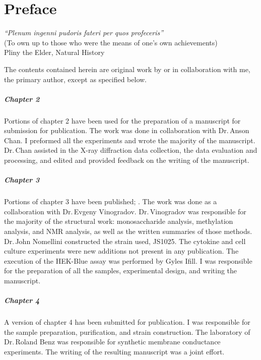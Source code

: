 
\chapter{Preface}
\begin{epigraph} 
\textit{``Plenum ingenni pudoris fateri per quos profeceris''}\\
(To own up to those who were the means of one's own achievements)\\
Pliny the Elder, Natural History
\end{epigraph} 

The contents contained herein are original work by or in collaboration with me,
the primary author, except as specified below.

\paragraph{Chapter 2} 
Portions of chapter 2 have been used for the preparation of a manuscript for
submission for publication. The work was done in collaboration with Dr.\,Anson
Chan. I preformed all the experiments and wrote the majority of the
manuscript. Dr.\,Chan assisted in the X-ray diffraction data collection, the
data evaluation and processing, and edited and provided feedback on the writing
of the manuscript. 

\paragraph{Chapter 3}
Portions of chapter 3 have been published; . The work was
done as a collaboration with Dr.\,Evgeny Vinogradov. Dr.\,Vinogradov was
responsible for the majority of the structural work: monosaccharide analysis,
methylation analysis, and \textsc{NMR} analysis, as well as the written
summaries of those methods. Dr.\,John Nomellini constructed the strain used,
JS1025. The cytokine and cell culture experiments were new additions not present
in any publication. The execution of the HEK-Blue assay was performed by Gyles Ifill. I was
responsible for the preparation of all the samples, experimental design, and
writing the manuscript. 

\paragraph{Chapter 4}
A version of chapter 4 has been submitted for publication. I was responsible for
the sample preparation, purification, and strain construction. The laboratory of
Dr.\,Roland Benz was responsible for synthetic membrane conductance experiments.
The writing of the resulting manuscript was a joint effort.